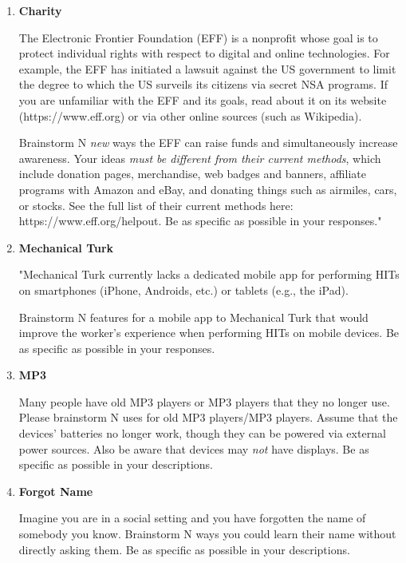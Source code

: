 \begin{enumerate}
\item \textbf{Charity}

The Electronic Frontier Foundation (EFF) is a nonprofit whose goal is to protect individual rights with respect to digital and online technologies. For example, the EFF has initiated a lawsuit against the US government to limit the degree to which the US surveils its citizens via secret NSA programs. If you are unfamiliar with the EFF and its goals, read about it on its website (https://www.eff.org) or via other online sources (such as Wikipedia).

Brainstorm N \emph{new} ways the EFF can raise funds and simultaneously increase awareness. Your ideas \emph{must be different from their current methods}, which include donation pages, merchandise, web badges and banners, affiliate programs with Amazon and eBay, and donating things such as airmiles, cars, or stocks. See the full list of their current methods here: https://www.eff.org/helpout. Be as specific as possible in your responses."

\item \textbf{Mechanical Turk}

"Mechanical Turk currently lacks a dedicated mobile app for performing HITs on smartphones (iPhone, Androids, etc.) or tablets (e.g., the iPad).

Brainstorm N features for a mobile app to Mechanical Turk that would improve the worker's experience when performing HITs on mobile devices. Be as specific as possible in your responses.

\item \textbf{MP3}

Many people have old MP3 players or MP3 players that they no longer use. Please brainstorm N uses for old MP3 players/MP3 players. Assume that the devices' batteries no longer work, though they can be powered via external power sources. Also be aware that devices may \emph{not} have displays. Be as specific as possible in your descriptions.

\item \textbf{Forgot Name}

Imagine you are in a social setting and you have forgotten the name of somebody you know. Brainstorm N ways you could learn their name without directly asking them. Be as specific as possible in your descriptions.

\end{enumerate}


